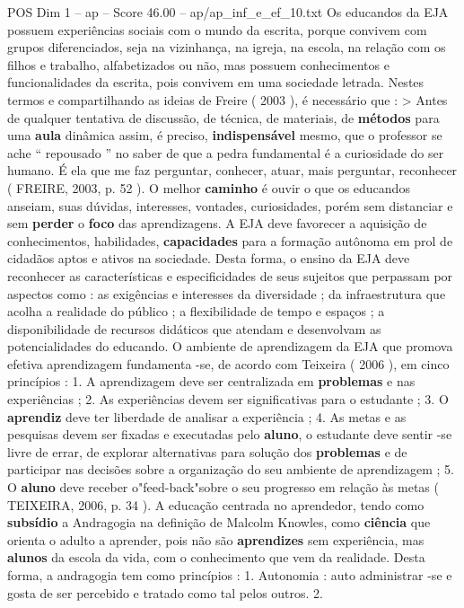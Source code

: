 \begin{textsample}{POS Dim 1 – ap – Score 46.00 – ap/ap\_inf\_e\_ef\_10.txt}
Os educandos da EJA possuem experiências sociais com o mundo da escrita, porque convivem com grupos diferenciados, seja na vizinhança, na igreja, na escola, na relação com os filhos e trabalho, alfabetizados ou não, mas possuem conhecimentos e funcionalidades da escrita, pois convivem em uma sociedade letrada.
Nestes termos e compartilhando as ideias de Freire ( 2003 ), é necessário que : > Antes de qualquer tentativa de discussão, de técnica, de materiais, de \textbf{métodos} para uma \textbf{aula} dinâmica assim, é preciso, \textbf{indispensável} mesmo, que o professor se ache “ repousado ” no saber de que a pedra fundamental é a curiosidade do ser humano.
É ela que me faz perguntar, conhecer, atuar, mais perguntar, reconhecer ( FREIRE, 2003, p. 52 ).
O melhor \textbf{caminho} é ouvir o que os educandos anseiam, suas dúvidas, interesses, vontades, curiosidades, porém sem distanciar e sem \textbf{perder} o \textbf{foco} das aprendizagens.
A EJA deve favorecer a aquisição de conhecimentos, habilidades, \textbf{capacidades} para a formação autônoma em prol de cidadãos aptos e ativos na sociedade.
Desta forma, o ensino da EJA deve reconhecer as características e especificidades de seus sujeitos que perpassam por aspectos como : as exigências e interesses da diversidade ; da infraestrutura que acolha a realidade do público ; a flexibilidade de tempo e espaços ; a disponibilidade de recursos didáticos que atendam e desenvolvam as potencialidades do educando.
O ambiente de aprendizagem da EJA que promova efetiva aprendizagem fundamenta -se, de acordo com Teixeira ( 2006 ), em cinco princípios : 1.
A aprendizagem deve ser centralizada em \textbf{problemas} e nas experiências ; 2.
As experiências devem ser significativas para o estudante ; 3.
O \textbf{aprendiz} deve ter liberdade de analisar a experiência ; 4.
As metas e as pesquisas devem ser fixadas e executadas pelo \textbf{aluno}, o estudante deve sentir -se livre de errar, de explorar alternativas para solução dos \textbf{problemas} e de participar nas decisões sobre a organização do seu ambiente de aprendizagem ; 5.
O \textbf{aluno} deve receber o"feed-back"sobre o seu progresso em relação às metas ( TEIXEIRA, 2006, p. 34 ).
A educação centrada no aprendedor, tendo como \textbf{subsídio} a Andragogia na definição de Malcolm Knowles, como \textbf{ciência} que orienta o adulto a aprender, pois não são \textbf{aprendizes} sem experiência, mas \textbf{alunos} da escola da vida, com o conhecimento que vem da realidade.
Desta forma, a andragogia tem como princípios : 1.
Autonomia : auto administrar -se e gosta de ser percebido e tratado como tal pelos outros. 2.

\end{textsample}

